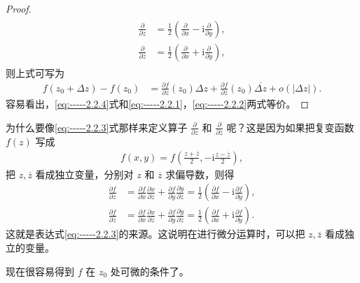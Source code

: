 \documentclass[../../main.tex]{subfiles}
\begin{document}
\begin{proof}
\begin{gather}
\begin{aligned}
\frac{\partial}{\partial z} &= \frac{1}{2}\left( \frac{\partial}{\partial x} - \text{i}\frac{\partial}{\partial y} \right), \\
\frac{\partial}{\partial \overline{z}} &= \frac{1}{2}\left( \frac{\partial}{\partial x} + \text{i}\frac{\partial}{\partial y} \right),
\end{aligned}
\end{gather}
则上式可写为
\begin{align}\label{eq:-----2.2.4}
f(z_0 + \Delta z) - f(z_0) &= \frac{\partial f}{\partial z}(z_0)\Delta z + \frac{\partial f}{\partial \overline{z}}(z_0)\overline{\Delta z} + o(|\Delta z|).
\end{align}
容易看出，\eqref{eq:-----2.2.4}式和\eqref{eq:-----2.2.1}，\eqref{eq:-----2.2.2}两式等价。
\end{proof}

\begin{remark}
为什么要像\eqref{eq:-----2.2.3}式那样来定义算子 \( \frac{\partial}{\partial z} \) 和 \( \frac{\partial}{\partial \overline{z}} \) 呢？这是因为如果把复变函数 \( f(z) \) 写成
\begin{align*}
f(x,y) = f\left( \frac{z + \overline{z}}{2}, -\text{i}\frac{z - \overline{z}}{2} \right),
\end{align*}
把 \( z,\overline{z} \) 看成独立变量，分别对 \( z \) 和 \( \overline{z} \) 求偏导数，则得
\begin{align*}
\frac{\partial f}{\partial z} &= \frac{\partial f}{\partial x}\frac{\partial x}{\partial z} + \frac{\partial f}{\partial y}\frac{\partial y}{\partial z} = \frac{1}{2}\left( \frac{\partial f}{\partial x} - \text{i}\frac{\partial f}{\partial y} \right), \\
\frac{\partial f}{\partial \overline{z}} &= \frac{\partial f}{\partial x}\frac{\partial x}{\partial \overline{z}} + \frac{\partial f}{\partial y}\frac{\partial y}{\partial \overline{z}} = \frac{1}{2}\left( \frac{\partial f}{\partial x} + \text{i}\frac{\partial f}{\partial y} \right).
\end{align*}
这就是表达式\eqref{eq:-----2.2.3}的来源。这说明在进行微分运算时，可以把 \( z,\overline{z} \) 看成独立的变量。

现在很容易得到 \( f \) 在 \( z_0 \) 处可微的条件了。
\end{remark}
\end{document}
